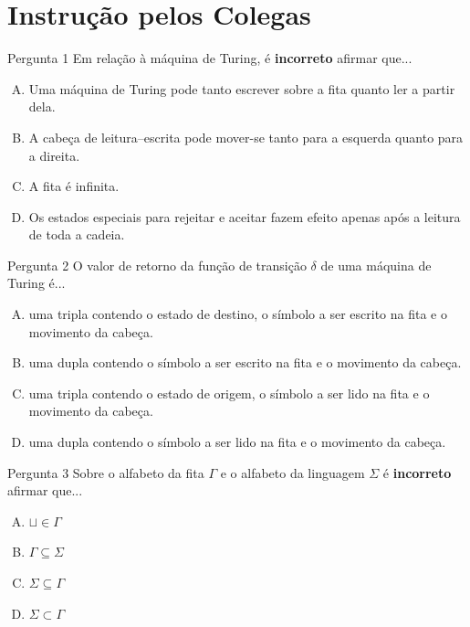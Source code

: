 \documentclass[xcolor=dvipsnames,table]{beamer}
\begin{document}
	\section{Instrução pelos Colegas}
	\begin{frame}
		\begin{block}{Pergunta 1}
			Em relação à máquina de Turing, é {\bf incorreto} afirmar que...
		\end{block}
		\begin{enumerate}[(A)]
			\item Uma máquina de Turing pode tanto escrever sobre a fita quanto ler a partir dela.
			\item A cabeça de leitura–escrita pode mover-se tanto para a esquerda quanto para a direita.
			\item A fita é infinita.
			\item Os estados especiais para rejeitar e aceitar fazem efeito apenas após a leitura de toda a cadeia.
		\end{enumerate}
	\end{frame}

	\begin{frame}
		\begin{block}{Pergunta 2}
			O valor de retorno da função de transição $\delta$ de uma máquina de Turing é...
		\end{block}
		\begin{enumerate}[(A)]
			\item uma tripla contendo o estado de destino, o símbolo a ser escrito na fita e o movimento da cabeça.
			\item uma dupla contendo o símbolo a ser escrito na fita e o movimento da cabeça.
			\item uma tripla contendo o estado de origem, o símbolo a ser lido na fita e o movimento da cabeça.
			\item uma dupla contendo o símbolo a ser lido na fita e o movimento da cabeça.
		\end{enumerate}
	\end{frame}

	\begin{frame}
		\begin{block}{Pergunta 3}
			Sobre o alfabeto da fita $\Gamma$ e o alfabeto da linguagem $\Sigma$ é {\bf incorreto} afirmar que...
		\end{block}
		\begin{enumerate}[(A)]
			\item $\sqcup \in \Gamma$ 
			\item $\Gamma \subseteq \Sigma$
			\item $\Sigma \subseteq \Gamma$
			\item $\Sigma \subset \Gamma$
		\end{enumerate}
	\end{frame}
\end{document}
